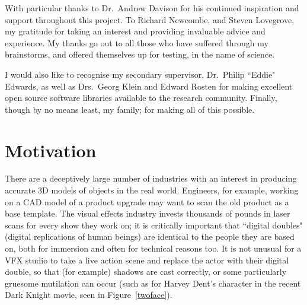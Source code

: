 \documentclass[a4paper,10pt]{article}
\begin{document}
\begin{acknowledgements}
With particular thanks to Dr.\ Andrew Davison for his continued inspiration and support throughout this project. To Richard Newcombe, and Steven Lovegrove, my gratitude for taking an interest and providing invaluable advice and experience. My thanks go out to all those who have suffered through my brainstorms, and offered themselves up for testing, in the name of science.

 I would also like to recognise my secondary supervisor, Dr.\ Philip ``Eddie" Edwards, as well as Drs.\ Georg Klein and Edward Rosten for making excellent open source software libraries available to the research community. Finally, though by no means least, my family; for making all of this possible.
\end{acknowledgements}

\pagebreak
\tableofcontents
\pagebreak

\begingroup
\renewcommand*{\addvspace}[1]{}
\setlength{\cftbeforefigskip}{5px}
\listoffigures
\endgroup

\newpage
{}

\section{Motivation}
There are a deceptively large number of industries with an interest in producing accurate 3D models of objects in the real world. Engineers, for example, working on a CAD model of a product upgrade may want to scan the old product as a base template. The visual effects industry invests thousands of pounds in laser scans for every show they work on; it is critically important that ``digital doubles" (digital replications of human beings) are identical to the people they are based on, both for immersion and often for technical reasons too. It is not unusual for a VFX studio to take a live action scene and replace the actor with their digital double, so that (for example) shadows are cast correctly, or some particularly gruesome mutilation can occur (such as for Harvey Dent's character in the recent Dark Knight movie, seen in Figure~\ref{twoface}).
\end{document}
